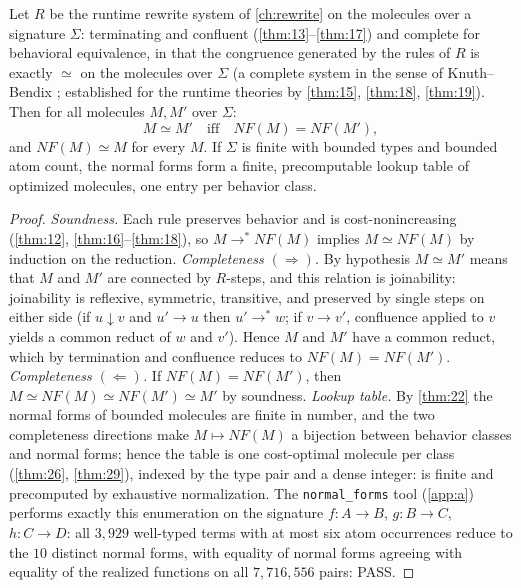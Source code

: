 \begin{theorem}\label{thm:24}
 Let $R$ be the runtime rewrite system of
\autoref{ch:rewrite} on the molecules over a signature $\Sigma$: terminating
and confluent (\autoref{thm:13}--\autoref{thm:17}) and complete for behavioral equivalence, in that
the congruence generated by the rules of $R$ is exactly $\simeq$ on the
molecules over $\Sigma$ (a complete system in the sense of Knuth--Bendix
\cite{knuthbendix}; established for the runtime theories by \autoref{thm:15}, \autoref{thm:18},
\autoref{thm:19}). Then for all molecules $M, M'$ over $\Sigma$:
\[
M \simeq M' \quad\text{iff}\quad \mathit{NF} (M) = \mathit{NF} (M'),
\]
and $\mathit{NF} (M) \simeq M$ for every $M$. If $\Sigma$ is finite with
bounded types and bounded atom count, the normal forms form a finite,
precomputable lookup table of optimized molecules, one entry per behavior
class.
\end{theorem}

\begin{proof}
\emph{Soundness.} Each rule preserves behavior and is cost-nonincreasing
(\autoref{thm:12}, \autoref{thm:16}--\autoref{thm:18}), so $M \to^{*} \mathit{NF} (M)$ implies $M \simeq
\mathit{NF} (M)$ by induction on the reduction.
\emph{Completeness $(\Rightarrow)$.} By hypothesis $M \simeq M'$ means that
$M$ and $M'$ are connected by $R$-steps, and this relation is joinability:
joinability is reflexive, symmetric, transitive, and preserved by single
steps on either side (if $u \downarrow v$ and $u' \to u$ then $u' \to^{*}
w$; if $v \to v'$, confluence applied to $v$ yields a common reduct of $w$
and $v'$). Hence $M$ and $M'$ have a common reduct, which by termination and
confluence reduces to $\mathit{NF} (M) = \mathit{NF} (M')$.
\emph{Completeness $(\Leftarrow)$.} If $\mathit{NF} (M) = \mathit{NF} (M')$,
then $M \simeq \mathit{NF} (M) \simeq \mathit{NF} (M') \simeq M'$ by soundness.
\emph{Lookup table.} By \autoref{thm:22} the normal forms of bounded molecules are finite
in number, and the two completeness directions make $M \mapsto \mathit{NF} (M)$
a bijection between behavior classes and normal forms; hence the table is
one cost-optimal molecule per class (\autoref{thm:26}, \autoref{thm:29}), indexed by the type pair
and a dense integer: is finite and precomputed by exhaustive normalization.
The \texttt{normal\_forms} tool (\autoref{app:a}) performs exactly this
enumeration on the signature $f \colon A \to B$, $g \colon B \to C$,
$h \colon C \to D$: all $3{,}929$ well-typed terms with at most six atom
occurrences reduce to the $10$ distinct normal forms, with equality of normal
forms agreeing with equality of the realized functions on all
$7{,}716{,}556$ pairs: PASS.
\end{proof}

